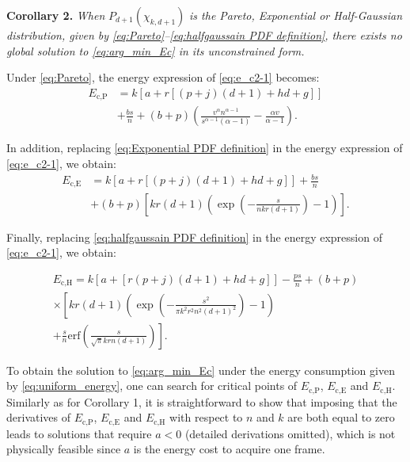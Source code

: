\documentclass[twocolumn,english]{IEEEtran}
\theoremstyle{plain}
\theoremstyle{definition}
\begin{document}
\textbf{Corollary 2.}\emph{ When }$P_{d+1}(\chi_{k,d+1})$ \emph{is
the Pareto, Exponential or Half-Gaussian distribution, given by \eqref{eq:Pareto}--\eqref{eq:halfgaussain PDF definition},
there exists no global solution to \eqref{eq:arg_min_Ec} in its unconstrained
form.} 
\begin{IEEEproof}
Under \eqref{eq:Pareto}, the energy expression of \eqref{eq:e_c2-1}
becomes: 
\begin{align}
E_{\text{c,P}} & =k\left[a+r\left[\left(p+j\right)\left(d+1\right)+hd+g\right]\right]\nonumber \\
 & +\frac{bs}{n}+\left(b+p\right)\left(\frac{v^{\alpha}n^{\alpha-1}}{s^{\alpha-1}\left(\alpha-1\right)}-\frac{\alpha v}{\alpha-1}\right).\label{eq:pareto_energy}
\end{align}


In addition, replacing \eqref{eq:Exponential PDF definition} in the
energy expression of \eqref{eq:e_c2-1}, we obtain: 
\begin{align}
E_{\text{c,E}} & =k\left[a+r\left[\left(p+j\right)\left(d+1\right)+hd+g\right]\right]+\frac{bs}{n}\label{eq:exponential_energy}\\
 & +\left(b+p\right)\left[kr\left(d+1\right)\left(\exp\left(-\frac{s}{nkr(d+1)}\right)-1\right)\right].\nonumber 
\end{align}


Finally, replacing \eqref{eq:halfgaussain PDF definition} in the
energy expression of \eqref{eq:e_c2-1}, we obtain:

\begin{equation}
\begin{array}{cc}
E_{\text{c,H}}=k\left[a+\left[r\left(p+j\right)\left(d+1\right)+hd+g\right]\right]-\frac{ps}{n}+\left(b+p\right)\\
\times\left[kr\left(d+1\right)\left(\exp\left(-\frac{s^{2}}{\pi k^{2}r^{2}n^{2}(d+1)^{2}}\right)-1\right)\right.\\
\left.+\frac{s}{n}\text{erf}\left(\frac{s}{\sqrt{\pi}krn(d+1)}\right)\right].
\end{array}\label{eq:halfgaussian_energy}
\end{equation}


To obtain the solution to \eqref{eq:arg_min_Ec} under the energy
consumption given by \eqref{eq:uniform_energy}, one can search for
critical points of $E_{\text{c,P}}$, $E_{\text{c,E}}$ and $E_{\text{c,H}}$.
Similarly as for Corollary 1, it is straightforward to show that imposing
that the derivatives of $E_{\text{c,P}}$, $E_{\text{c,E}}$ and $E_{\text{c,H}}$
with respect to $n$ and $k$ are both equal to zero leads to solutions
that require $a<0$ (detailed derivations omitted), which is not physically
feasible since $a$ is the energy cost to acquire one frame. 
\end{IEEEproof}
\end{document}
